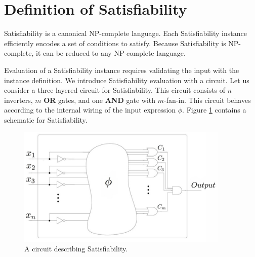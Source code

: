 	
\section{Definition of {\sc Satisfiability}}

	
{\sc Satisfiability} is a canonical \textsf{NP-complete} language.  Each {\sc Satisfiability} instance efficiently encodes a set of conditions to satisfy.  Because {\sc Satisfiability} is \textsf{NP-complete}, it can be reduced to any \textsf{NP-complete} language.


Evaluation of a {\sc Satisfiability} instance requires validating the input with the instance definition.  We introduce {\sc Satisfiability} evaluation with a circuit.  Let us consider a three-layered circuit for {\sc Satisfiability}.  This circuit consists of $n$ inverters, $m$ \textbf{OR} gates, and one \textbf{AND} gate with $m$-fan-in.  This circuit behaves according to the internal wiring of the input expression $\phi$. Figure \ref{blackBoxSat} contains a schematic for {\sc Satisfiability}.	
\begin{figure}[htbp]
\begin{center}

	\includegraphics[width=0.9\textwidth]{figures/circuitLabeled.jpg}

\caption{A circuit describing {\sc Satisfiability}.}
\label{blackBoxSat}
\end{center}
\end{figure}
	
